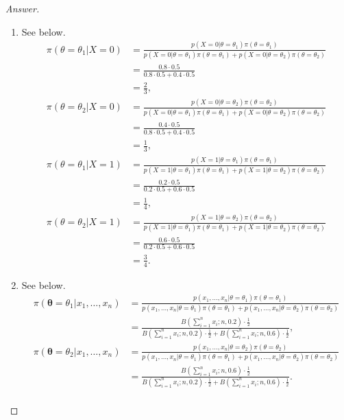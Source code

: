 \documentclass{amsbook}
\theoremstyle{definition}
\theoremstyle{remark}
\numberwithin{section}{chapter}
\numberwithin{equation}{chapter}
\begin{document}
\begin{proof}[Answer]
\begin{enumerate}[label=(\alph*)]
\item See below.\[
\begin{split}
\pi(\theta=\theta_1|X=0)&=\frac{p(X=0|\theta=\theta_1)\pi(\theta=\theta_1)}{p(X=0|\theta=\theta_1)\pi(\theta=\theta_1)+p(X=0|\theta=\theta_2)\pi(\theta=\theta_2)}\\
&=\frac{0.8\cdot0.5}{0.8\cdot0.5+0.4\cdot0.5}\\
&=\frac{2}{3},\\
\pi(\theta=\theta_2|X=0)&=\frac{p(X=0|\theta=\theta_2)\pi(\theta=\theta_2)}{p(X=0|\theta=\theta_1)\pi(\theta=\theta_1)+p(X=0|\theta=\theta_2)\pi(\theta=\theta_2)}\\
&=\frac{0.4\cdot0.5}{0.8\cdot0.5+0.4\cdot0.5}\\
&=\frac{1}{3},\\
\pi(\theta=\theta_1|X=1)&=\frac{p(X=1|\theta=\theta_1)\pi(\theta=\theta_1)}{p(X=1|\theta=\theta_1)\pi(\theta=\theta_1)+p(X=1|\theta=\theta_2)\pi(\theta=\theta_2)}\\
&=\frac{0.2\cdot0.5}{0.2\cdot0.5+0.6\cdot0.5}\\
&=\frac{1}{4},\\
\pi(\theta=\theta_2|X=1)&=\frac{p(X=1|\theta=\theta_2)\pi(\theta=\theta_2)}{p(X=1|\theta=\theta_1)\pi(\theta=\theta_1)+p(X=1|\theta=\theta_2)\pi(\theta=\theta_2)}\\
&=\frac{0.6\cdot0.5}{0.2\cdot0.5+0.6\cdot0.5}\\
&=\frac{3}{4}.
\end{split}
\]
\item See below.\[
\begin{split}
\pi(\bm{\theta}=\theta_1|x_1,\dots,x_n)&=\frac{p(x_1,\dots,x_n|\theta=\theta_1)\pi(\theta=\theta_1)}{p(x_1,\dots,x_n|\theta=\theta_1)\pi(\theta=\theta_1)+p(x_1,\dots,x_n|\theta=\theta_2)\pi(\theta=\theta_2)}\\
&=\frac{B(\sum_{i=1}^nx_i;n,0.2)\cdot\frac{1}{2}}{B(\sum_{i=1}^nx_i;n,0.2)\cdot\frac{1}{2} + B(\sum_{i=1}^nx_i;n,0.6)\cdot\frac{1}{2}},\\
\pi(\bm{\theta}=\theta_2|x_1,\dots,x_n)&=\frac{p(x_1,\dots,x_n|\theta=\theta_2)\pi(\theta=\theta_2)}{p(x_1,\dots,x_n|\theta=\theta_1)\pi(\theta=\theta_1)+p(x_1,\dots,x_n|\theta=\theta_2)\pi(\theta=\theta_2)}\\
&=\frac{B(\sum_{i=1}^nx_i;n,0.6)\cdot\frac{1}{2}}{B(\sum_{i=1}^nx_i;n,0.2)\cdot\frac{1}{2} + B(\sum_{i=1}^nx_i;n,0.6)\cdot\frac{1}{2}}.\\

\end{split}\]
\end{enumerate}
\end{proof}
\end{document}
